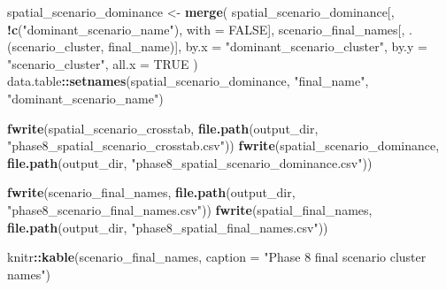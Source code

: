 \documentclass[
]{article}
\newenvironment{Shaded}{\begin{snugshade}}{\end{snugshade}}
\newcommand{\AttributeTok}[1]{\textcolor[rgb]{0.13,0.29,0.53}{#1}}
\newcommand{\ConstantTok}[1]{\textcolor[rgb]{0.56,0.35,0.01}{#1}}
\newcommand{\FunctionTok}[1]{\textcolor[rgb]{0.13,0.29,0.53}{\textbf{#1}}}
\newcommand{\NormalTok}[1]{#1}
\newcommand{\OtherTok}[1]{\textcolor[rgb]{0.56,0.35,0.01}{#1}}
\newcommand{\SpecialCharTok}[1]{\textcolor[rgb]{0.81,0.36,0.00}{\textbf{#1}}}
\newcommand{\StringTok}[1]{\textcolor[rgb]{0.31,0.60,0.02}{#1}}
\begin{document}
\begin{Shaded}
\begin{Highlighting}[]
\NormalTok{spatial\_scenario\_dominance }\OtherTok{\textless{}{-}} \FunctionTok{merge}\NormalTok{(}
\NormalTok{  spatial\_scenario\_dominance[, }\SpecialCharTok{!}\FunctionTok{c}\NormalTok{(}\StringTok{"dominant\_scenario\_name"}\NormalTok{), }\AttributeTok{with =} \ConstantTok{FALSE}\NormalTok{],}
\NormalTok{  scenario\_final\_names[, .(scenario\_cluster, final\_name)],}
  \AttributeTok{by.x =} \StringTok{"dominant\_scenario\_cluster"}\NormalTok{,}
  \AttributeTok{by.y =} \StringTok{"scenario\_cluster"}\NormalTok{,}
  \AttributeTok{all.x =} \ConstantTok{TRUE}
\NormalTok{)}
\NormalTok{data.table}\SpecialCharTok{::}\FunctionTok{setnames}\NormalTok{(spatial\_scenario\_dominance, }\StringTok{"final\_name"}\NormalTok{, }\StringTok{"dominant\_scenario\_name"}\NormalTok{)}

\FunctionTok{fwrite}\NormalTok{(spatial\_scenario\_crosstab, }\FunctionTok{file.path}\NormalTok{(output\_dir, }\StringTok{"phase8\_spatial\_scenario\_crosstab.csv"}\NormalTok{))}
\FunctionTok{fwrite}\NormalTok{(spatial\_scenario\_dominance, }\FunctionTok{file.path}\NormalTok{(output\_dir, }\StringTok{"phase8\_spatial\_scenario\_dominance.csv"}\NormalTok{))}

\FunctionTok{fwrite}\NormalTok{(scenario\_final\_names, }\FunctionTok{file.path}\NormalTok{(output\_dir, }\StringTok{"phase8\_scenario\_final\_names.csv"}\NormalTok{))}
\FunctionTok{fwrite}\NormalTok{(spatial\_final\_names, }\FunctionTok{file.path}\NormalTok{(output\_dir, }\StringTok{"phase8\_spatial\_final\_names.csv"}\NormalTok{))}

\NormalTok{knitr}\SpecialCharTok{::}\FunctionTok{kable}\NormalTok{(scenario\_final\_names, }\AttributeTok{caption =} \StringTok{"Phase 8 final scenario cluster names"}\NormalTok{)}
\end{Highlighting}
\end{Shaded}
\end{document}
